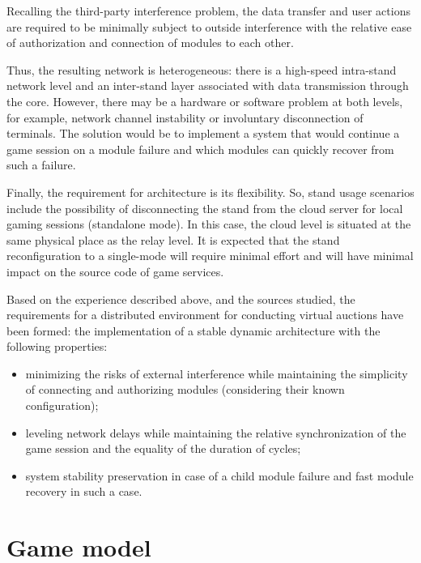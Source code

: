 \documentclass[
]{ceurart}
\begin{document}
Recalling the third-party interference problem, the data transfer and user actions are required to be minimally subject to outside interference with the relative ease of authorization and connection of modules to each other.

Thus, the resulting network is heterogeneous: there is a high-speed intra-stand network level and an inter-stand layer associated with data transmission through the core. However, there may be a hardware or software problem at both levels, for example, network channel instability or involuntary disconnection of terminals. The solution would be to implement a system that would continue a game session on a module failure and which modules can quickly recover from such a failure.

Finally, the requirement for architecture is its flexibility. So, stand usage scenarios include the possibility of disconnecting the stand from the cloud server for local gaming sessions (standalone mode). In this case, the cloud level is situated at the same physical place as the relay level. It is expected that the stand reconfiguration to a single-mode will require minimal effort and will have minimal impact on the source code of game services.

Based on the experience described above, and the sources studied, the requirements for a distributed environment for conducting virtual auctions have been formed: the implementation of a stable dynamic architecture with the following properties:
\begin{itemize}
\item minimizing the risks of external interference while maintaining the simplicity of connecting and authorizing modules (considering their known configuration);
\item leveling network delays while maintaining the relative synchronization of the game session and the equality of the duration of cycles;
\item system stability preservation in case of a child module failure and fast module recovery in such a case.
\end{itemize}

\section{Game model}
\label{sec:gamemodel}
\end{document}
